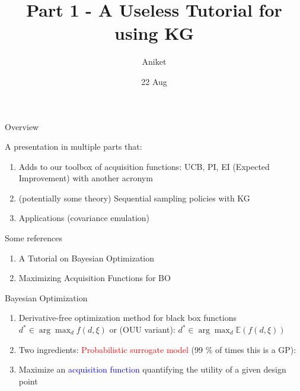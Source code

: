 \documentclass[usenames,dvipsnames]{beamer}
\title[Seminar]{Part 1 - A Useless Tutorial for using KG}
\author[AJ]{Aniket}
\institute[U-M]{University of Michigan}
\date{22 Aug}
\theoremstyle{definition}
\let\oldcite=\cite
\renewcommand{\cite}[2][]{\textcolor{green}{\oldcite[#1]{#2}}}
\begin{document}
\begin{frame}
\titlepage %
\end{frame}


\begin{frame}{Overview}

A presentation in multiple parts that:

\begin{enumerate}
    \item Adds to our toolbox of acquisition functions: UCB, PI, EI (Expected Improvement) with another acronym
    
    \item (potentially some theory) Sequential sampling policies with KG
    
    \item Applications (covariance emulation)
\end{enumerate}

\end{frame}

\begin{frame}{Some references}
    \begin{enumerate}
        \item A Tutorial on Bayesian Optimization \cite{frazier_tutorial_2018}
        
        \item Maximizing Acquisition Functions for BO \cite{}
    \end{enumerate}
\end{frame}

\begin{frame}{Bayesian Optimization}
    \begin{enumerate}
        \item Derivative-free optimization method for black box functions
        $d^\ast \in \arg \max_d f(d, \xi)$ or (OUU variant): $d^\ast \in \arg \max_d \mathbb{E}(f(d, \xi))$
        
        \item Two ingredients: 
        \textcolor{red}{Probabilistic surrogate model} (99 \% of times this is a GP):

        

        \item Maximize an \textcolor{blue}{acquisition function} quantifying the utility of a given design point
    \end{enumerate}

\end{frame}
\end{document}
